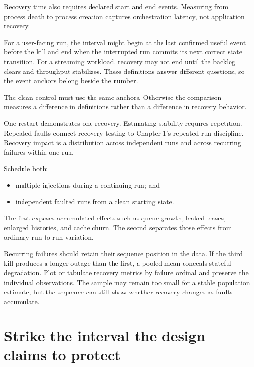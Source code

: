 Recovery time also requires declared start and end events. Measuring from process death to process creation captures orchestration latency, not application recovery.

For a user-facing run, the interval might begin at the last confirmed useful event before the kill and end when the interrupted run commits its next correct state transition. For a streaming workload, recovery may not end until the backlog clears and throughput stabilizes. These definitions answer different questions, so the event anchors belong beside the number.

The clean control must use the same anchors. Otherwise the comparison measures a difference in definitions rather than a difference in recovery behavior.

One restart demonstrates one recovery. Estimating stability requires repetition. Repeated faults connect recovery testing to Chapter 1's repeated-run discipline. Recovery impact is a distribution across independent runs and across recurring failures within one run.


Schedule both:

\begin{itemize}
\tightlist
\item
  multiple injections during a continuing run; and
\item
  independent faulted runs from a clean starting state.
\end{itemize}

The first exposes accumulated effects such as queue growth, leaked leases, enlarged histories, and cache churn. The second separates those effects from ordinary run-to-run variation.

Recurring failures should retain their sequence position in the data. If the third kill produces a longer outage than the first, a pooled mean conceals stateful degradation. Plot or tabulate recovery metrics by failure ordinal and preserve the individual observations. The sample may remain too small for a stable population estimate, but the sequence can still show whether recovery changes as faults accumulate.

\hypertarget{strike-the-interval-the-design-claims-to-protect}{%
\section{Strike the interval the design claims to protect}\label{strike-the-interval-the-design-claims-to-protect}}

